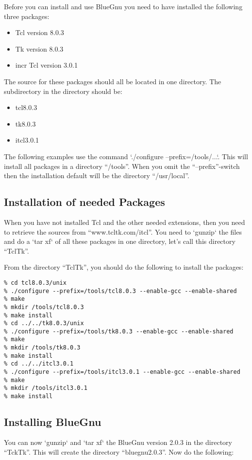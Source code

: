 Before you can install and use BlueGnu you need to have installed the
following three packages:
\begin{itemize}
\item Tcl version 8.0.3
\item Tk version 8.0.3
\item incr Tcl version 3.0.1
\end{itemize}
The source for these packages should all be located in one directory.
The subdirectory in the directory should be:
\begin{itemize}
\item tcl8.0.3
\item tk8.0.3
\item itcl3.0.1
\end{itemize}

The following examples use the command `./configure
--prefix=/tools/...`. This will install all packages in a directory
``/tools''. When you omit the ``--prefix''-switch then the
installation default will be the directory ``/usr/local''.

\subsection{Installation of needed Packages}

When you have not installed Tcl and the other needed extensions, then
you need to retrieve the sources from ``www.tcltk.com/itcl''. You need
to `gunzip` the files and do a `tar xf` of all these packages in one
directory, let's call this directory ``TclTk''.

From the directory ``TclTk'', you should do the following to install
the packages:

\begin{verbatim}
% cd tcl8.0.3/unix
% ./configure --prefix=/tools/tcl8.0.3 --enable-gcc --enable-shared
% make
% mkdir /tools/tcl8.0.3
% make install
% cd ../../tk8.0.3/unix
% ./configure --prefix=/tools/tk8.0.3 --enable-gcc --enable-shared
% make
% mkdir /tools/tk8.0.3
% make install
% cd ../../itcl3.0.1
% ./configure --prefix=/tools/itcl3.0.1 --enable-gcc --enable-shared
% make
% mkdir /tools/itcl3.0.1
% make install
\end{verbatim}

\subsection{Installing BlueGnu}
You can now `gunzip` and `tar xf` the BlueGnu version 2.0.3 in the
directory ``TckTk''. This will create the directory
``bluegnu2.0.3''. Now do the following:

